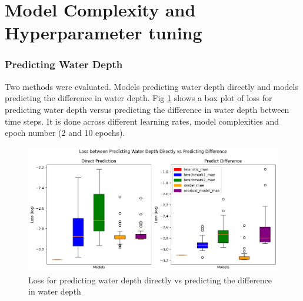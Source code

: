 \section{Model Complexity and Hyperparameter tuning}

\subsubsection*{Predicting Water Depth}
Two methods were evaluated. Models predicting water depth directly and models predicting the difference in water depth. Fig \ref{fig:diffvsnodiff} shows a box plot of loss for predicting water depth versus predicting the difference in water depth between time steps. It is done across different learning rates, model complexities and epoch number (2 and 10 epochs).
\begin{figure}[tbph]
	\centering
	\includegraphics[width=0.8\linewidth, height=0.3\textheight]{Figures/Results/Diff_Complexity_Lr_Epochs/Predicting_Diff/box_dif_v_no_diff}
	\caption[Predicting water depth difference vs predicting water depth directly]{Loss for predicting water depth directly vs predicting the difference in water depth}
	\label{fig:diffvsnodiff}
\end{figure}

